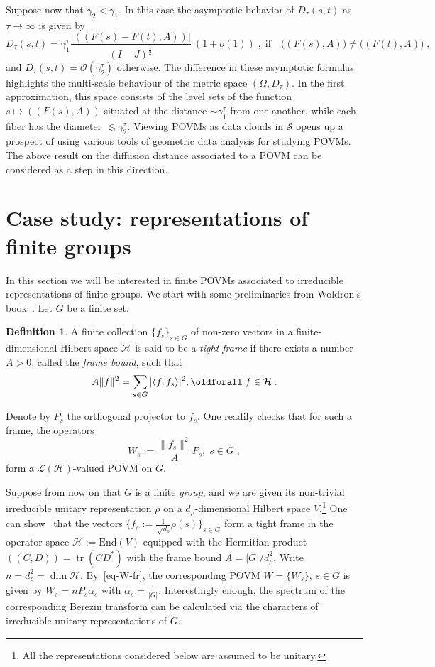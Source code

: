 \documentclass[11pt]{article}
\theoremstyle{definition}
\newtheorem{defi}[theo]{Definition}
\numberwithin{equation}{section}
\numberwithin{figure}{section}
\numberwithin{table}{section}
\DeclareMathOperator{\tr}{tr}
\newcommand{\cS}{{\mathcal{S}}}
\newcommand{\Hilb}{\mathcal{H}}
\newcommand\< {\mathcal{h}}
\renewcommand\> {\mathcal{i}}
\newcommand*\cL{\mathscr{L}}
\renewcommand*{\forall}{\mathrel{\oldforall}}
\begin{document}
Suppose now that $\gamma_2 < \gamma_1$. In this case the asymptotic behavior of $D_\tau(s,t)$ as $\tau \to \infty$ is given by
\begin{equation}
D_\tau(s,t)= \gamma_1^\tau\frac{|((F(s)-F(t),A))|}{(I-J)^{\frac{1}{2}}}\ (1+o(1))\;,\;\text{if}\quad \big((F(s),A))\neq ((F(t),A)\big)\;,
\end{equation}
and $D_\tau(s,t) = \mathcal{O}(\gamma_2^\tau)$ otherwise. The difference in these asymptotic formulas highlights the multi-scale behaviour of the metric space $(\Omega, D_\tau)$. In the first approximation, this space consists of the level sets of the function $s \mapsto ((F(s),A))$ situated at the distance $\sim \gamma_1^\tau$ from one another, while each fiber has the diameter $\lesssim \gamma_2^\tau$. Viewing POVMs as data clouds in $\cS$ opens up a prospect of using various tools of geometric data analysis for studying POVMs. The above result on the diffusion distance associated to a POVM can be considered as a step in this direction.

\section{Case study: representations of finite groups} \label{sec-groups}
In this section we will be interested in finite POVMs associated to irreducible representations of finite groups. We start with some preliminaries from Woldron's book~\cite{W}. Let $G$ be a finite set.

\begin{defi}\label{def-tight frame}
A finite collection $\{f_s\}_{s\in G}$ of non-zero vectors in a finite-dimensional Hilbert space $\Hilb$ is said to be a \emph{tight frame} if there exists a number $A > 0$, called the \emph{frame bound}, such that
\begin{equation}\label{Bessel}
A\| f \|^2 =\sum_{s\in G}|\langle f, f_s \rangle|^2, \forall f\in \Hilb\;.
\end{equation}
\end{defi}

Denote by $P_s$ the orthogonal projector to $f_s$. One readily checks that for such a frame, the operators
\begin{equation}\label{eq-W-fr}
W_s:= \frac{\|f_s\|^2}{A} P_s, \; s \in G\;,
\end{equation}
form a $\cL(\Hilb)$-valued POVM on $G$.

Suppose from now on that $G$ is a finite \emph{ group}, and we are given its non-trivial irreducible unitary representation $\rho$ on a $d_\rho$-dimensional Hilbert space $V$.\footnote{All the representations considered below are assumed to be unitary.} One can show~\cite{W} that the vectors $\{f_s:=\frac{1}{\sqrt{d_\rho}}\rho(s)\}_{s\in G}$ form a tight frame in the operator space $\Hilb:=\text{End}(V)$ equipped with the Hermitian product $((C,D)) = \tr (CD^*)$ with the frame bound $A={| G |}/{d_\rho ^2}$. Write $n=d_\rho^2 =\dim \Hilb$. By~\eqref{eq-W-fr}, the corresponding POVM $W= \{W_s\}$, $s \in G$ is given by $W_s = n P_s \alpha_s$ with $\alpha_s = \frac{1}{| G |}$. Interestingly enough, the spectrum of the corresponding Berezin transform can be calculated via the characters of irreducible unitary representations of $G$.
\end{document}
